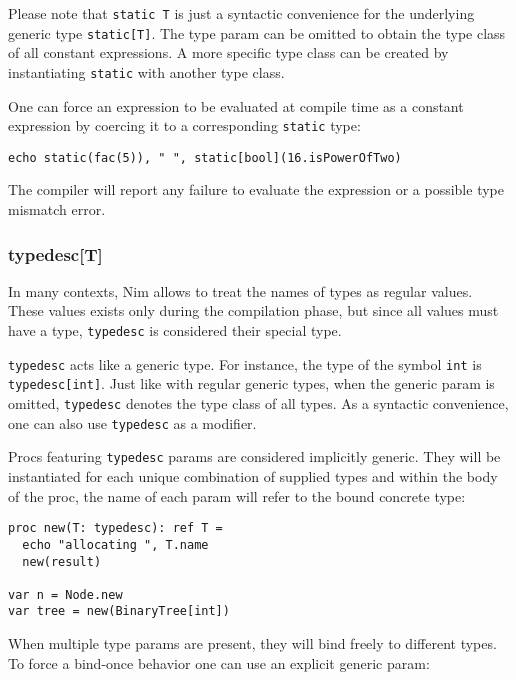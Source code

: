 Please note that \texttt{static\ T} is just a syntactic convenience for
the underlying generic type \texttt{static{[}T{]}}. The type param can
be omitted to obtain the type class of all constant expressions. A more
specific type class can be created by instantiating \texttt{static} with
another type class.

One can force an expression to be evaluated at compile time as a
constant expression by coercing it to a corresponding \texttt{static}
type:

\begin{verbatim}
echo static(fac(5)), " ", static[bool](16.isPowerOfTwo)
\end{verbatim}

The compiler will report any failure to evaluate the expression or a
possible type mismatch error.

\hypertarget{typedesct}{%
\subsubsection{typedesc{[}T{]}}\label{typedesct}}

In many contexts, Nim allows to treat the names of types as regular
values. These values exists only during the compilation phase, but since
all values must have a type, \texttt{typedesc} is considered their
special type.

\texttt{typedesc} acts like a generic type. For instance, the type of
the symbol \texttt{int} is \texttt{typedesc{[}int{]}}. Just like with
regular generic types, when the generic param is omitted,
\texttt{typedesc} denotes the type class of all types. As a syntactic
convenience, one can also use \texttt{typedesc} as a modifier.

Procs featuring \texttt{typedesc} params are considered implicitly
generic. They will be instantiated for each unique combination of
supplied types and within the body of the proc, the name of each param
will refer to the bound concrete type:

\begin{verbatim}
proc new(T: typedesc): ref T =
  echo "allocating ", T.name
  new(result)

var n = Node.new
var tree = new(BinaryTree[int])
\end{verbatim}

When multiple type params are present, they will bind freely to
different types. To force a bind-once behavior one can use an explicit
generic param:

\begin{verbatim}
\end{verbatim}

